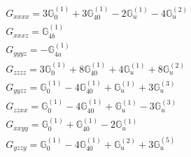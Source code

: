 \documentclass[fleqn,8pt,landscape]{jsarticle}
\begin{document}
\begin{align*}
& G_{xxxx} = 3 \mathbb{G}_{0}^{(1)} + 3 \mathbb{G}_{40}^{(1)} - 2 \mathbb{G}_{u}^{(1)} - 4 \mathbb{G}_{u}^{(2)} \\
& G_{xxxz} = \mathbb{G}_{4b}^{(1)} \\
& G_{yyyz} = - \mathbb{G}_{4a}^{(1)} \\
& G_{zzzz} = 3 \mathbb{G}_{0}^{(1)} + 8 \mathbb{G}_{40}^{(1)} + 4 \mathbb{G}_{u}^{(1)} + 8 \mathbb{G}_{u}^{(2)} \\
& G_{yyzz} = \mathbb{G}_{0}^{(1)} - 4 \mathbb{G}_{40}^{(1)} + \mathbb{G}_{u}^{(1)} + 3 \mathbb{G}_{u}^{(3)} \\
& G_{zzxx} = \mathbb{G}_{0}^{(1)} - 4 \mathbb{G}_{40}^{(1)} + \mathbb{G}_{u}^{(1)} - 3 \mathbb{G}_{u}^{(3)} \\
& G_{xxyy} = \mathbb{G}_{0}^{(1)} + \mathbb{G}_{40}^{(1)} - 2 \mathbb{G}_{u}^{(1)} \\
& G_{yzzy} = \mathbb{G}_{0}^{(1)} - 4 \mathbb{G}_{40}^{(1)} + \mathbb{G}_{u}^{(2)} + 3 \mathbb{G}_{u}^{(5)}
\end{align*}
\end{document}
